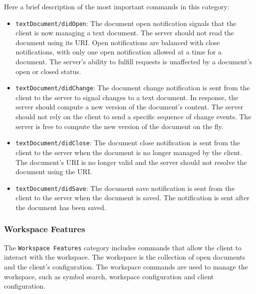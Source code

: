 Here a brief description of the most important commands in this category:
\begin{itemize}
    \item \texttt{textDocument/didOpen}: The document open notification signals that the client is now managing a text document. The server should not read the document using its URI. Open notifications are balanced with close notifications, with only one open notification allowed at a time for a document. The server's ability to fulfill requests is unaffected by a document's open or closed status.
    \item \texttt{textDocument/didChange}: The document change notification is sent from the client to the server to signal changes to a text document. In response, the server should compute a new version of the document's content. The server should not rely on the client to send a specific sequence of change events. The server is free to compute the new version of the document on the fly.
    \item \texttt{textDocument/didClose}: The document close notification is sent from the client to the server when the document is no longer managed by the client. The document's URI is no longer valid and the server should not resolve the document using the URI.
    \item \texttt{textDocument/didSave}: The document save notification is sent from the client to the server when the document is saved. The notification is sent after the document has been saved.
\end{itemize}

\subsubsection{Workspace Features}\label{subsec:background:WorkspaceFeatures}
The \texttt{Workspace Features} category includes commands that allow the client to interact with the workspace. The workspace is the collection of open documents and the client's configuration. The workspace commands are used to manage the workspace, such as symbol search, workspace configuration and client configuration.

